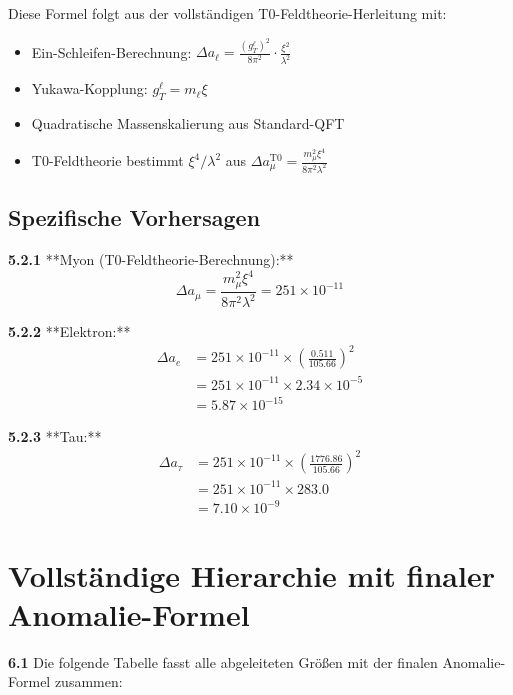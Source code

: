 \documentclass[12pt,a4paper]{article}
\begin{document}
	Diese Formel folgt aus der vollständigen T0-Feldtheorie-Herleitung mit:
	\begin{itemize}
		\item Ein-Schleifen-Berechnung: $\Delta a_\ell = \frac{(g_T^\ell)^2}{8\pi^2} \cdot \frac{\xi^2}{\lambda^2}$
		\item Yukawa-Kopplung: $g_T^\ell = m_\ell \xi$
		\item Quadratische Massenskalierung aus Standard-QFT
		\item T0-Feldtheorie bestimmt $\xi^4/\lambda^2$ aus $\Delta a_\mu^{\text{T0}} = \frac{m_\mu^2 \xi^4}{8\pi^2 \lambda^2}$
	\end{itemize}
	
	\subsection{Spezifische Vorhersagen}
	
	\noindent \textbf{5.2.1} **Myon (T0-Feldtheorie-Berechnung):**
	\begin{equation}
		\Delta a_\mu = \frac{m_\mu^2 \xi^4}{8\pi^2 \lambda^2} = 251 \times 10^{-11}
	\end{equation}
	
	\noindent \textbf{5.2.2} **Elektron:**
	\begin{align}
		\Delta a_e &= 251 \times 10^{-11} \times \left(\frac{0.511}{105.66}\right)^2 \\
		&= 251 \times 10^{-11} \times 2.34 \times 10^{-5} \\
		&= 5.87 \times 10^{-15}
	\end{align}
	
	\noindent \textbf{5.2.3} **Tau:**
	\begin{align}
		\Delta a_\tau &= 251 \times 10^{-11} \times \left(\frac{1776.86}{105.66}\right)^2 \\
		&= 251 \times 10^{-11} \times 283.0 \\
		&= 7.10 \times 10^{-9}
	\end{align}
	
	\section{Vollständige Hierarchie mit finaler Anomalie-Formel}
	
	\noindent \textbf{6.1} Die folgende Tabelle fasst alle abgeleiteten Größen mit der finalen Anomalie-Formel zusammen:
	
\end{document}
